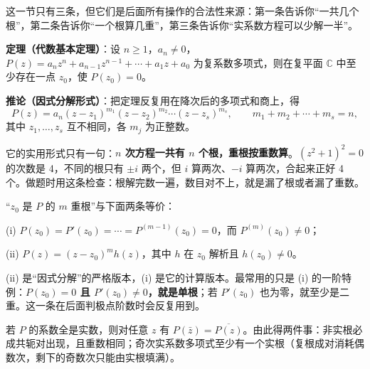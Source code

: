 \documentclass[11pt]{ctexart}
\let\origsubhdr\subhdr
\renewcommand{\subhdr}[1]{\par\needspace{4\baselineskip}\origsubhdr{#1}}
\let\orighdr\hdr
\renewcommand{\hdr}[2]{\par\orighdr{#1}{#2}}
\begin{document}


这一节只有三条，但它们是后面所有操作的合法性来源：第一条告诉你“一共几个根”，第二条告诉你“一个根算几重”，第三条告诉你“实系数方程可以少解一半”。


\textbf{定理（代数基本定理）}：设 $n\ge1$，$a_n\ne0$，$P(z)=a_nz^{n}+a_{n-1}z^{n-1}+\cdots+a_1z+a_0$ 为复系数多项式，则在复平面 $\mathbb{C}$ 中至少存在一点 $z_0$，使 $P(z_0)=0$。

\textbf{推论（因式分解形式）}：把定理反复用在降次后的多项式和商上，得
\begin{equation}
P(z)=a_n(z-z_1)^{m_1}(z-z_2)^{m_2}\cdots(z-z_s)^{m_s},
\qquad m_1+m_2+\cdots+m_s=n,
\label{eq:factor}
\end{equation}
其中 $z_1,\dots,z_s$ 互不相同，各 $m_j$ 为正整数。

它的实用形式只有一句：\textbf{$n$ 次方程一共有 $n$ 个根，重根按重数算}。$(z^{2}+1)^{2}=0$ 的次数是 4，不同的根只有 $\pm i$ 两个，但 $i$ 算两次、$-i$ 算两次，合起来正好 4 个。做题时用这条检查：根解完数一遍，数目对不上，就是漏了根或者漏了重数。



“$z_0$ 是 $P$ 的 $m$ 重根”与下面两条等价：

(i) $P(z_0)=P'(z_0)=\cdots=P^{(m-1)}(z_0)=0$，而 $P^{(m)}(z_0)\ne0$；

(ii) $P(z)=(z-z_0)^{m}h(z)$，其中 $h$ 在 $z_0$ 解析且 $h(z_0)\ne0$。

(ii) 是“因式分解”的严格版本，(i) 是它的计算版本。最常用的只是 (i) 的一阶特例：\textbf{$P(z_0)=0$ 且 $P'(z_0)\ne0$，就是单根}；若 $P'(z_0)$ 也为零，就至少是二重。这一条在后面判极点阶数时会反复用到。


若 $P$ 的系数全是实数，则对任意 $z$ 有 $P(\bar z)=\overline{P(z)}$。由此得两件事：非实根必成共轭对出现，且重数相同；奇次实系数多项式至少有一个实根（复根成对消耗偶数次，剩下的奇数次只能由实根填满）。

\end{document}
